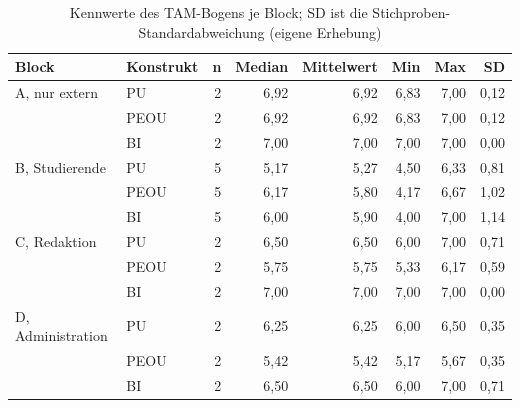 \begin{table}[htbp]
	\centering
	\footnotesize
	\caption[Kennwerte des TAM-Bogens je Block]{Kennwerte des TAM-Bogens je Block; SD ist die Stichproben-Standardabweichung (eigene Erhebung)}
	\label{tab:tam-bloecke}
	\begin{tabular}{@{}llrrrrrr@{}}
		\toprule
		\textbf{Block} & \textbf{Konstrukt} & \textbf{n} & \textbf{Median} & \textbf{Mittelwert} & \textbf{Min} & \textbf{Max} & \textbf{SD} \\
		\midrule
		A, nur extern & PU & 2 & 6,92 & 6,92 & 6,83 & 7,00 & 0,12 \\
		 & PEOU & 2 & 6,92 & 6,92 & 6,83 & 7,00 & 0,12 \\
		 & BI & 2 & 7,00 & 7,00 & 7,00 & 7,00 & 0,00 \\
		\midrule
		B, Studierende & PU & 5 & 5,17 & 5,27 & 4,50 & 6,33 & 0,81 \\
		 & PEOU & 5 & 6,17 & 5,80 & 4,17 & 6,67 & 1,02 \\
		 & BI & 5 & 6,00 & 5,90 & 4,00 & 7,00 & 1,14 \\
		\midrule
		C, Redaktion & PU & 2 & 6,50 & 6,50 & 6,00 & 7,00 & 0,71 \\
		 & PEOU & 2 & 5,75 & 5,75 & 5,33 & 6,17 & 0,59 \\
		 & BI & 2 & 7,00 & 7,00 & 7,00 & 7,00 & 0,00 \\
		\midrule
		D, Administration & PU & 2 & 6,25 & 6,25 & 6,00 & 6,50 & 0,35 \\
		 & PEOU & 2 & 5,42 & 5,42 & 5,17 & 5,67 & 0,35 \\
		 & BI & 2 & 6,50 & 6,50 & 6,00 & 7,00 & 0,71 \\
		\bottomrule
	\end{tabular}
\end{table}
